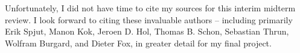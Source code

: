 \documentclass{article}
\begin{document}
\begin{thebibliography}{}
Unfortunately, I did not have time to cite my sources for this interim midterm review. I look forward to citing these invaluable authors -- including primarily Erik Spjut, Manon Kok, Jeroen D. Hol, Thomas B. Schon, Sebastian Thrun, Wolfram Burgard, and Dieter Fox, in greater detail for my final project.

\end{thebibliography}
\end{document}
